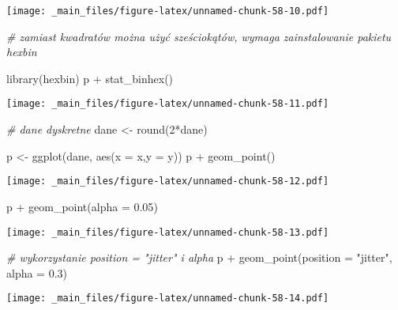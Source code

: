 \documentclass[
]{book}
\newenvironment{Shaded}{\begin{snugshade}}{\end{snugshade}}
\newcommand{\AttributeTok}[1]{\textcolor[rgb]{0.77,0.63,0.00}{#1}}
\newcommand{\CommentTok}[1]{\textcolor[rgb]{0.56,0.35,0.01}{\textit{#1}}}
\newcommand{\DecValTok}[1]{\textcolor[rgb]{0.00,0.00,0.81}{#1}}
\newcommand{\FloatTok}[1]{\textcolor[rgb]{0.00,0.00,0.81}{#1}}
\newcommand{\FunctionTok}[1]{\textcolor[rgb]{0.00,0.00,0.00}{#1}}
\newcommand{\NormalTok}[1]{#1}
\newcommand{\OtherTok}[1]{\textcolor[rgb]{0.56,0.35,0.01}{#1}}
\newcommand{\SpecialCharTok}[1]{\textcolor[rgb]{0.00,0.00,0.00}{#1}}
\newcommand{\StringTok}[1]{\textcolor[rgb]{0.31,0.60,0.02}{#1}}
\begin{document}
\texttt{[image: \_main\_files/figure-latex/unnamed-chunk-58-10.pdf]}

\begin{Shaded}
\begin{Highlighting}[]
\CommentTok{\# zamiast kwadratów można użyć sześciokątów, wymaga zainstalowanie pakietu hexbin}

\FunctionTok{library}\NormalTok{(hexbin)}
\NormalTok{p }\SpecialCharTok{+} \FunctionTok{stat\_binhex}\NormalTok{()}
\end{Highlighting}
\end{Shaded}

\texttt{[image: \_main\_files/figure-latex/unnamed-chunk-58-11.pdf]}

\begin{Shaded}
\begin{Highlighting}[]
\CommentTok{\# dane dyskretne}
\NormalTok{dane }\OtherTok{\textless{}{-}} \FunctionTok{round}\NormalTok{(}\DecValTok{2}\SpecialCharTok{*}\NormalTok{dane)}

\NormalTok{p }\OtherTok{\textless{}{-}} \FunctionTok{ggplot}\NormalTok{(dane, }\FunctionTok{aes}\NormalTok{(}\AttributeTok{x =}\NormalTok{ x,}\AttributeTok{y =}\NormalTok{ y))}
\NormalTok{p }\SpecialCharTok{+} \FunctionTok{geom\_point}\NormalTok{()}
\end{Highlighting}
\end{Shaded}

\texttt{[image: \_main\_files/figure-latex/unnamed-chunk-58-12.pdf]}

\begin{Shaded}
\begin{Highlighting}[]
\NormalTok{p }\SpecialCharTok{+} \FunctionTok{geom\_point}\NormalTok{(}\AttributeTok{alpha =} \FloatTok{0.05}\NormalTok{)}
\end{Highlighting}
\end{Shaded}

\texttt{[image: \_main\_files/figure-latex/unnamed-chunk-58-13.pdf]}

\begin{Shaded}
\begin{Highlighting}[]
\CommentTok{\# wykorzystanie position = "jitter" i alpha}
\NormalTok{p }\SpecialCharTok{+} \FunctionTok{geom\_point}\NormalTok{(}\AttributeTok{position =} \StringTok{"jitter"}\NormalTok{, }\AttributeTok{alpha =} \FloatTok{0.3}\NormalTok{)}
\end{Highlighting}
\end{Shaded}

\texttt{[image: \_main\_files/figure-latex/unnamed-chunk-58-14.pdf]}
\end{document}
